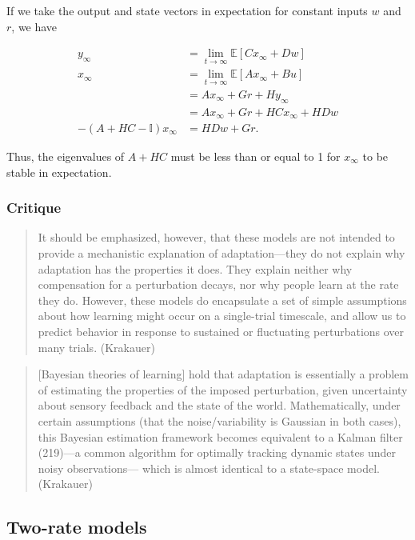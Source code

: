 \documentclass[../main.tex]{subfiles}
\begin{document}
If we take the output and state vectors in expectation for constant
inputs \(w\) and \(r\), we have

\[
\begin{aligned}
y_\infty &= \lim_{t\to\infty}\mathbb{E}\left[Cx_\infty + Dw\right] \\
x_\infty &= \lim_{t\to\infty}\mathbb{E}\left[Ax_\infty + Bu\right] \\
&= Ax_\infty + Gr + Hy_\infty \\
&= Ax_\infty + Gr + HCx_\infty + HDw \\
-(A + HC - \mathbb{I})x_\infty &= HDw + Gr.
\end{aligned}
\]

Thus, the eigenvalues of \(A + HC\) must be less than or equal to 1 for
\(x_\infty\) to be stable in expectation.

\subsubsection{Critique}\label{critique}

\begin{quote}
It should be emphasized, however, that these models are not intended to
provide a mechanistic explanation of adaptation---they do not explain
why adaptation has the properties it does. They explain neither why
compensation for a perturbation decays, nor why people learn at the rate
they do. However, these models do encapsulate a set of simple
assumptions about how learning might occur on a single-trial timescale,
and allow us to predict behavior in response to sustained or fluctuating
perturbations over many trials. (Krakauer)
\end{quote}

\begin{quote}
{[}Bayesian theories of learning{]} hold that adaptation is essentially
a problem of estimating the properties of the imposed perturbation,
given uncertainty about sensory feedback and the state of the world.
Mathematically, under certain assumptions (that the noise/variability is
Gaussian in both cases), this Bayesian estimation framework becomes
equivalent to a Kalman filter (219)---a common algorithm for optimally
tracking dynamic states under noisy observations--- which is almost
identical to a state-space model. (Krakauer)
\end{quote}

\subsection{Two-rate models}\label{two-rate-models}
\end{document}
